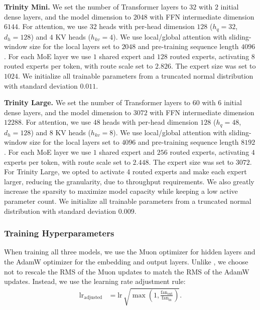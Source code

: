 \documentclass{article}
\begin{document}
\textbf{Trinity Mini.}
We set the number of Transformer layers to $32$ with $2$ initial dense layers, and the model dimension to $2048$ with FFN intermediate dimension $6144$.
For attention, we use $32$ heads with per-head dimension $128$ ($h_q{=}32$, $d_h{=}128$) and $4$ KV heads ($h_{kv}{=}4$).
We use local/global attention with sliding-window size for the local layers set to $2048$ and pre-training sequence length $4096$.
For each MoE layer we use $1$ shared expert and $128$ routed experts, activating $8$ routed experts per token, with route scale set to $2.826$. The expert size was set to $1024$.
We initialize all trainable parameters from a truncated normal distribution with standard deviation $0.011$.

\textbf{Trinity Large.}
We set the number of Transformer layers to $60$ with $6$ initial dense layers, and the model dimension to $3072$ with FFN intermediate dimension $12288$.
For attention, we use $48$ heads with per-head dimension $128$ ($h_q{=}48$, $d_h{=}128$) and $8$ KV heads ($h_{kv}{=}8$).
We use local/global attention with sliding-window size for the local layers set to $4096$ and pre-training sequence length $8192$.
For each MoE layer we use $1$ shared expert and $256$ routed experts, activating $4$ experts per token, with route scale set to $2.448$. The expert size was set to $3072$. For Trinity Large, we opted to activate 4 routed experts and make each expert larger, reducing the granularity, due to throughput requirements. We also greatly increase the sparsity to maximize model capacity while keeping a low active parameter count.
We initialize all trainable parameters from a truncated normal distribution with standard deviation $0.009$.

\subsubsection{Training Hyperparameters}
When training all three models, we use the Muon optimizer \citep{jordan2024muon} for hidden layers and the AdamW optimizer \citep{loshchilov2019decoupledweightdecayregularization} for the embedding and output layers. Unlike \cite{liu2025muonscalablellmtraining}, we choose not to rescale the RMS of the Muon updates to match the RMS of the AdamW updates. Instead, we use the learning rate adjustment rule:
\begin{align}
\mathrm{lr}_{\mathrm{adjusted}}
&=
\mathrm{lr}\,\sqrt{\max\!\left(1,\frac{\mathrm{fan}_{\mathrm{out}}}{\mathrm{fan}_{\mathrm{in}}}\right)}.
\tag{41}
\end{align}
\end{document}
